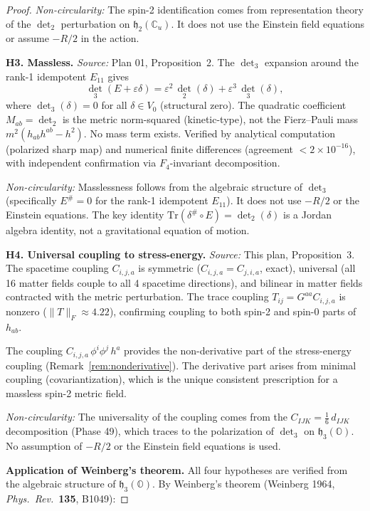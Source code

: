 \documentclass[11pt]{article}
\newcommand{\Tr}{\mathrm{Tr}}
\newcommand{\h}{\mathfrak{h}}
\begin{document}
\begin{proof}
\emph{Non-circularity:} The spin-2 identification comes from
representation theory of the $\det_2$ perturbation on $\h_2(\mathbb{C}_u)$.
It does not use the Einstein field equations or assume $-R/2$ in the action.

\medskip
\noindent\textbf{H3. Massless.}
\emph{Source:} Plan 01, Proposition~2.
The $\det_3$ expansion around the rank-1 idempotent $E_{11}$ gives
\[
  \det_3(E + \varepsilon\delta) = \varepsilon^2\,\det_2(\delta)
    + \varepsilon^3\,\det_3(\delta),
\]
where $\det_3(\delta) = 0$ for all $\delta \in V_0$ (structural zero).
The quadratic coefficient $M_{ab} = \det_2$ is the metric norm-squared
(kinetic-type), not the Fierz--Pauli mass
$m^2(h_{ab}h^{ab} - h^2)$. No mass term exists.
Verified by analytical computation (polarized sharp map) and numerical
finite differences (agreement $< 2 \times 10^{-16}$), with independent
confirmation via $F_4$-invariant decomposition.

\emph{Non-circularity:} Masslessness follows from the algebraic
structure of $\det_3$ (specifically $E^\# = 0$ for the rank-1
idempotent $E_{11}$). It does not use $-R/2$ or the Einstein equations.
The key identity $\Tr(\delta^\# \circ E) = \det_2(\delta)$ is a
Jordan algebra identity, not a gravitational equation of motion.

\medskip
\noindent\textbf{H4. Universal coupling to stress-energy.}
\emph{Source:} This plan, Proposition~3.
The spacetime coupling $C_{i,j,a}$ is symmetric ($C_{i,j,a} = C_{j,i,a}$,
exact), universal (all 16 matter fields couple to all 4 spacetime
directions), and bilinear in matter fields contracted with the metric
perturbation. The trace coupling $T_{ij} = G^{aa} C_{i,j,a}$ is
nonzero ($\|T\|_F \approx 4.22$), confirming coupling to both spin-2
and spin-0 parts of $h_{ab}$.

The coupling $C_{i,j,a}\,\phi^i\phi^j\,h^a$ provides the non-derivative
part of the stress-energy coupling (Remark~\ref{rem:nonderivative}).
The derivative part arises from minimal coupling (covariantization),
which is the unique consistent prescription for a massless spin-2
metric field.

\emph{Non-circularity:} The universality of the coupling comes from
the $C_{IJK} = \tfrac{1}{6}\,d_{IJK}$ decomposition (Phase 49),
which traces to the polarization of $\det_3$ on $\h_3(\mathbb{O})$.
No assumption of $-R/2$ or the Einstein field equations is used.

\medskip
\noindent\textbf{Application of Weinberg's theorem.}
All four hypotheses are verified from the algebraic structure of
$\h_3(\mathbb{O})$. By Weinberg's theorem (Weinberg 1964,
\emph{Phys.\ Rev.}\ \textbf{135}, B1049):


\end{proof}
\end{document}
